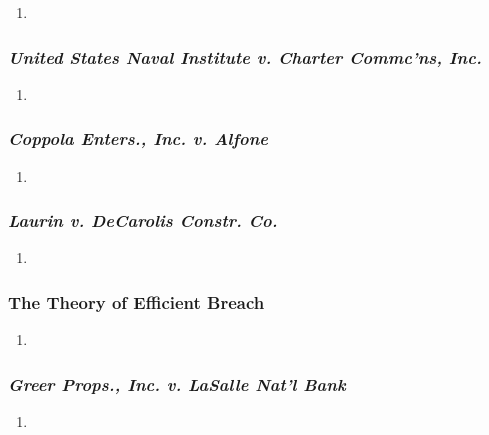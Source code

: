 \begin{enumerate}
    \item %
\end{enumerate}

\subsubsection{\emph{United States Naval Institute v. Charter Commc'ns, Inc.}}

\begin{enumerate}
    \item %
\end{enumerate}

\subsubsection{\emph{Coppola Enters., Inc. v. Alfone}}

\begin{enumerate}
    \item %
\end{enumerate}

\subsubsection{\emph{Laurin v. DeCarolis Constr. Co.}}

\begin{enumerate}
    \item %
\end{enumerate}

\subsubsection{The Theory of Efficient Breach}

\begin{enumerate}
    \item %
\end{enumerate}

\subsubsection{\emph{Greer Props., Inc. v. LaSalle Nat'l Bank}}

\begin{enumerate}
    \item %
\end{enumerate}


